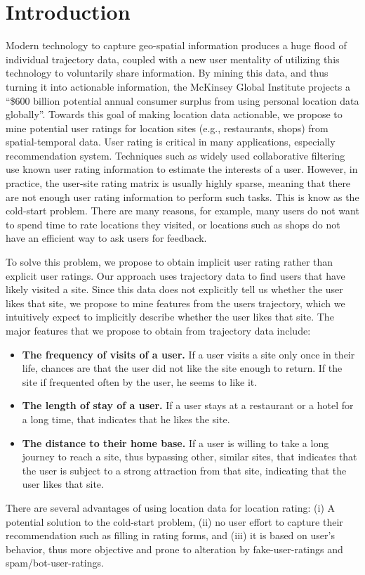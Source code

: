 \section{Introduction}\label{sec:intro}
Modern technology to capture geo-spatial information produces a
huge flood of individual trajectory data, coupled with a new
user mentality of utilizing this technology to voluntarily share information. 
By mining this data, and thus
turning it into actionable information, the McKinsey Global Institute \cite{manyika2011big} projects a ``\$600 billion
potential annual consumer surplus from using personal location data globally''. 
Towards this goal of making location data actionable, we propose to mine potential user ratings for location sites (e.g., restaurants, shops) from spatial-temporal data. User rating is critical in many applications, especially recommendation system. Techniques such as widely used collaborative filtering use known user rating information to estimate the interests of a user. However, in practice, the user-site rating matrix is usually highly sparse, meaning that there are not enough user rating information to perform such tasks. This is know as the cold-start problem. There are many reasons, for example, many users do not want to spend time to rate locations they visited, or locations such as shops do not have an efficient way to ask users for feedback.

To solve this problem, we propose to obtain implicit user rating rather than explicit user ratings. Our approach uses trajectory data to find users that have likely visited a site. Since this data does not explicitly tell us whether the user likes that site, we propose to mine features from the users trajectory, which we intuitively expect to implicitly describe whether the user likes that site. The major features that we propose to obtain from trajectory data include:
\begin{itemize}
\item {\bf The frequency of visits of a user.} If a user visits a site only once in their life, chances are that the user did not like the site enough to return. If the site if frequented often by the user, he seems to like it.
\item {\bf The length of stay of a user.} If a user stays at a restaurant or a hotel for a long time, that indicates that he likes the site.
\item {\bf The distance to their home base.} If a user is willing to take a long journey to reach a site, thus bypassing other, similar sites, that indicates that the user is subject to a strong attraction from that site, indicating that the user likes that site.  
\end{itemize}
There are several advantages of using location data for location rating: (i) A potential solution to the cold-start problem, (ii) no user effort to capture their recommendation such as filling in rating forms, and (iii) it is based on user's behavior, thus more objective and prone to alteration by fake-user-ratings and spam/bot-user-ratings.

